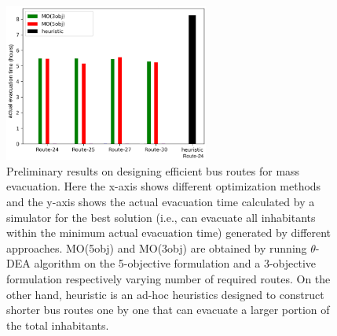 \begin{figure}[!htbp]
	\centering
	
	\includegraphics[width=0.6\textwidth]{Figure/halifax}
	\caption[Preliminary results on designing efficient bus routes for mass evacuation.]{Preliminary results on designing efficient bus routes for mass evacuation. Here the x-axis shows different optimization methods and the y-axis shows the actual evacuation time calculated by a simulator for the best solution (i.e., can evacuate all inhabitants within the minimum actual evacuation time) generated by different approaches. MO(5obj) and MO(3obj) are obtained by running $\theta$-DEA algorithm on the 5-objective formulation and a 3-objective formulation respectively varying number of required routes. On the other hand, heuristic is an ad-hoc heuristics designed to construct shorter bus routes one by one that can evacuate a larger portion of the total inhabitants.}
	
	\label{fig:halifax}
\end{figure}
%
%
%
%
